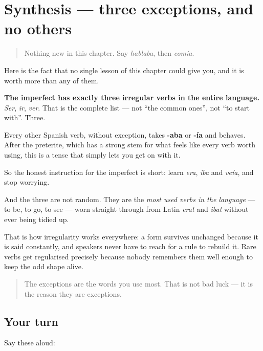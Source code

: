 \section[Practice]{Synthesis — three exceptions, and no others}

\label{lesson:ES-C16-sintesis-imperfecto}



\begin{quote}
Nothing new in this chapter. Say \emph{hablaba}, then \emph{comía}.
\end{quote}

\begin{grammarlens}[title={What you've built}]
Here is the fact that no single lesson of this chapter could give you, and it is worth more than any of them.

\textbf{The imperfect has exactly three irregular verbs in the entire language.} \emph{Ser}, \emph{ir}, \emph{ver}. That is the complete list — not \textquotedblleft{}the common ones\textquotedblright{}, not \textquotedblleft{}to start with\textquotedblright{}. Three.

Every other Spanish verb, without exception, takes \textbf{-aba} or \textbf{-ía} and behaves. After the preterite, which has a strong stem for what feels like every verb worth using, this is a tense that simply lets you get on with it.

So the honest instruction for the imperfect is short: learn \emph{era}, \emph{iba} and \emph{veía}, and stop worrying.
\end{grammarlens}

\begin{cousinweb}
And the three are not random. They are the \emph{most used verbs in the language} — to be, to go, to see — worn straight through from Latin \emph{erat} and \emph{ibat} without ever being tidied up.

That is how irregularity works everywhere: a form survives unchanged because it is said constantly, and speakers never have to reach for a rule to rebuild it. Rare verbs get regularised precisely because nobody remembers them well enough to keep the odd shape alive.

\begin{quote}
The exceptions are the words you use most. That is not bad luck — it is the reason they are exceptions.
\end{quote}
\end{cousinweb}

\subsection*{Your turn}
Say these aloud:

